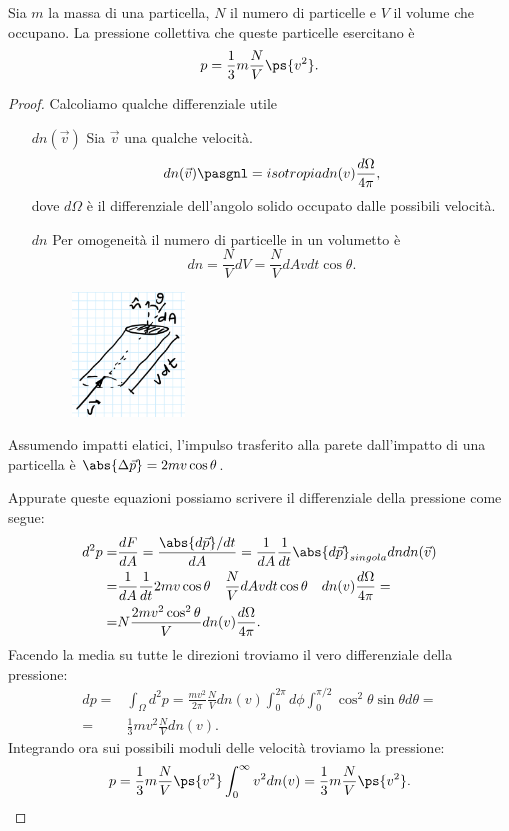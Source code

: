\begin{proposition}\label{CalcoloDellaPressioneTeoriaCineticaDeiGas}
Sia $m$ la massa di una particella, $N$ il numero di particelle e $V$ il volume che occupano. La pressione collettiva che queste particelle esercitano \`e
\[p=\frac13m\frac NV\ps{v^2}.\]
\end{proposition}
\begin{proof}
Calcoliamo qualche differenziale utile
\setlength{\leftmargini}{0cm}
\begin{itemize}
\item[$\boxed{dn(\vec v)}$] Sia $\vec v$ una qualche velocit\`a.
\[dn(\vec v)\pasgnl={isotropia}dn(v)\frac{d\Omega}{4\pi},\]
dove $d\Omega$ \`e il differenziale dell'angolo solido occupato dalle possibili velocit\`a. 
\item[$\boxed{dn}$] Per omogeneit\`a il numero di particelle in un volumetto \`e
\[dn=\frac NVdV=\frac NV dAvdt\cos\theta.\]
\begin{figure}[!htb]
    \centering
    \includegraphics[width=3cm]{images/volumetto_per_impulso_infinitesimo.png}
\end{figure}
\end{itemize}
\setlength{\leftmargini}{0.5cm}
Assumendo impatti elatici, l'impulso trasferito alla parete dall'impatto di una particella \`e $\abs{\Delta \vec p}=2mv\cos \theta$.\medskip

\noindent Appurate queste equazioni possiamo scrivere il differenziale della pressione come segue:
\begin{align*}
d^2p=&\frac{dF}{dA}=\frac{\abs{d\vec p}/dt}{dA}=\frac1{dA}\frac1{dt}\abs{d\vec p}_{singola}dn dn(\vec v)\\
=&\frac1{dA}\frac1{dt}{2mv\cos \theta}\quad{\frac{N}V dAvdt\cos \theta}\quad{dn(v)\frac{d\Omega}{4\pi}}=\\
=&N\frac{2mv^2\cos^2\theta}Vdn(v)\frac{d\Omega}{4\pi}.
\end{align*}
Facendo la media su tutte le direzioni troviamo il vero differenziale della pressione:
\begin{align*}
dp=&\int_\Omega d^2p=\frac{mv^2}{2\pi}\frac NVdn(v)\int_0^{2\pi}d\phi\int_0^{\pi/2}\cos^2\theta\sin\theta d\theta=\\
=&\frac13mv^2\frac NVdn(v).
\end{align*}
Integrando ora sui possibili moduli delle velocit\`a troviamo la pressione:
\[p=\frac13m\frac NV\ps{v^2}\int_0^\infty v^2dn(v)=\frac13m\frac NV\ps{v^2}.\]
\end{proof}


